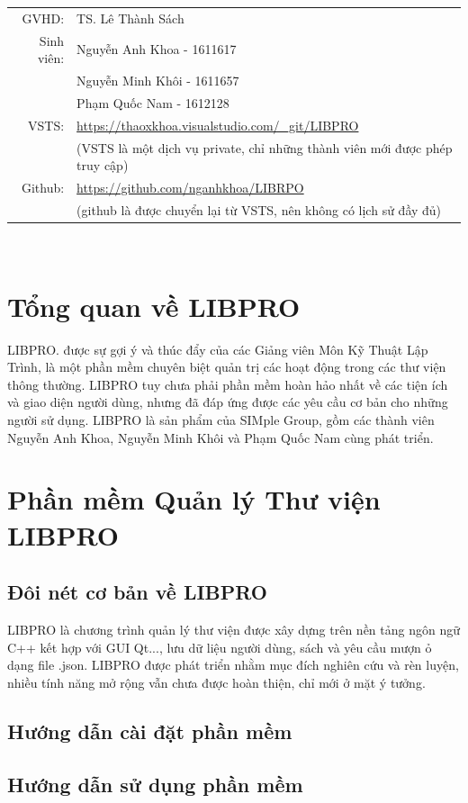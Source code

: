 \documentclass[12pt,a4paper]{report}
\begin{document}
\begin{titlepage}
\begin{center}
\begin{tabular}{r l}
                GVHD:&TS. Lê Thành Sách\\
                Sinh viên:&Nguyễn Anh Khoa - 1611617\\
                &Nguyễn Minh Khôi - 1611657\\
                &Phạm Quốc Nam - 1612128\\
            VSTS:& \url{https://thaoxkhoa.visualstudio.com/_git/LIBPRO}\\
            &(VSTS là một dịch vụ private, chỉ những thành viên mới được phép truy cập)\\
            Github:& \url{https://github.com/nganhkhoa/LIBRPO}\\
            &(github là được chuyển lại từ VSTS, nên không có lịch sử đầy đủ)
            \end{tabular}\\
        \end{center}
    \end{titlepage}
\newpage
\chapter{Tổng quan về LIBPRO}
LIBPRO. được sự gợi ý và thúc đẩy của các Giảng viên Môn Kỹ Thuật Lập Trình, là một phần mềm chuyên biệt quản trị các hoạt động trong các thư viện thông thường. LIBPRO tuy chưa phải phần mềm hoàn hảo nhất về các tiện ích và giao diện người dùng, nhưng đã đáp ứng được các yêu cầu cơ bản cho những người sử dụng. LIBPRO là sản phẩm của SIMple Group, gồm các thành viên Nguyễn Anh Khoa, Nguyễn Minh Khôi và Phạm Quốc Nam cùng phát triển.
\chapter{Phần mềm Quản lý Thư viện LIBPRO}
    \section{Đôi nét cơ bản về LIBPRO}
    LIBPRO là chương trình quản lý thư viện được xây dựng trên nền tảng ngôn ngữ C++ kết hợp với GUI Qt..., lưu dữ liệu người dùng, sách và yêu cầu mượn ỏ dạng file .json. LIBPRO được phát triển nhằm mục đích nghiên cứu và rèn luyện, nhiều tính năng mở rộng vẫn chưa được hoàn thiện, chỉ mới ở mặt ý tưởng.
    \section{Hướng dẫn cài đặt phần mềm}
    \section{Hướng dẫn sử dụng phần mềm}
\end{document}
